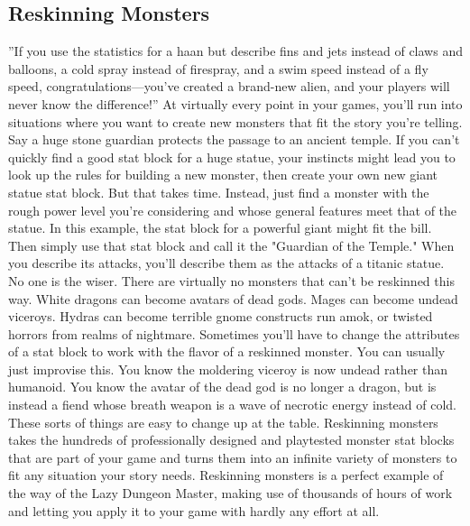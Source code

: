 \documentclass[10pt,a4paper,twoside,bg=print,twocolumn,openany,nodeprecatedcode]{dndbook}
\begin{document}
\subsection{Reskinning Monsters}
\DndQuote%
{}
{''If you use the statistics for a haan but describe fins and jets instead of claws and balloons, a cold spray instead of firespray, and a swim speed instead of a fly speed, congratulations—you've created a brand-new alien, and your players will never know the difference!''}
{}
At virtually every point in your games, you'll run into situations where you want to create new monsters that fit the story you're telling. Say a huge stone guardian protects the passage to an ancient temple. If you can't quickly find a good stat block for a huge statue, your instincts might lead you to look up the rules for building a new monster, then create your own new giant statue stat block. But that takes time.
Instead, just find a monster with the rough power level you're considering and whose general features meet that of the statue. In this example, the stat block for a powerful giant might fit the bill. Then simply use that stat block and call it the "Guardian of the Temple." When you describe its attacks, you'll describe them as the attacks of a titanic statue. No one is the wiser.
There are virtually no monsters that can't be reskinned this way. White dragons can become avatars of dead gods. Mages can become undead viceroys. Hydras can become terrible gnome constructs run amok, or twisted horrors from realms of nightmare.
Sometimes you'll have to change the attributes of a stat block to work with the flavor of a reskinned monster. You can usually just improvise this. You know the moldering viceroy is now undead rather than humanoid. You know the avatar of the dead god is no longer a dragon, but is instead a fiend whose breath weapon is a wave of necrotic energy instead of cold. These sorts of things are easy to change up at the table.
Reskinning monsters takes the hundreds of professionally designed and playtested monster stat blocks that are part of your game and turns them into an infinite variety of monsters to fit any situation your story needs. Reskinning monsters is a perfect example of the way of the Lazy Dungeon Master, making use of thousands of hours of work and letting you apply it to your game with hardly any effort at all.
\end{document}
